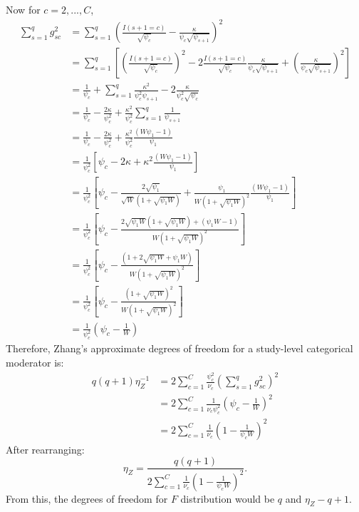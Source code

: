 Now for $c = 2,...,C$, 
\begin{equation}
    \begin{aligned}
\sum_{s=1}^q g_{sc}^2 &= \sum_{s=1}^q \left(\frac{I(s+1 = c)}{\sqrt{\psi_{c}}} - \frac{\kappa}{\psi_c \sqrt{\psi_{s+1}}}\right)^2 \\
&= \sum_{s=1}^q \left[ \left( \frac{I(s+1 = c)}{\sqrt{\psi_c}} \right)^2 - 2 \frac{I(s+1 = c)}{\sqrt{\psi_c}} \frac{\kappa}{\psi_c \sqrt{\psi_{s+1}}} + \left( \frac{\kappa}{\psi_c \sqrt{\psi_{s+1}}} \right)^2 \right] \\
&= \frac{1}{\psi_c} + \sum_{s=1}^q \frac{\kappa^2}{\psi_c^2 \psi_{s+1}} - 2 \frac{\kappa}{\psi_c^2 \sqrt{\psi_{c}}}\\
&= \frac{1}{\psi_c} - \frac{2 \kappa}{\psi_c^2} + \frac{\kappa^2}{\psi_c^2}\sum_{s=1}^q \frac{1}{\psi_{s+1}} \\
&= \frac{1}{\psi_c} - \frac{2 \kappa}{\psi_c^2} + \frac{\kappa^2}{\psi_c^2}\frac{(W \psi_1 - 1)}{\psi_1} \\
&= \frac{1}{\psi_c^2}\left[\psi_c - 2\kappa + \kappa^2\frac{(W \psi_1 - 1)}{\psi_1}\right] \\
&= \frac{1}{\psi_c^2}\left[\psi_c - \frac{2\sqrt{\psi_1}}{\sqrt{W}(1+\sqrt{\psi_1 W})} + \frac{\psi_1}{W(1+\sqrt{\psi_1 W})^2}\frac{(W \psi_1 - 1)}{\psi_1}\right] \\
&= \frac{1}{\psi_c^2}\left[\psi_c - \frac{2\sqrt{\psi_1 W}(1 + \sqrt{\psi_1 W}) +(\psi_1 W - 1)}{W(1+\sqrt{\psi_1 W})^2}  \right] \\
&= \frac{1}{\psi_c^2}\left[\psi_c - \frac{(1+2\sqrt{\psi_1 W}+\psi_1 W)}{W(1+\sqrt{\psi_1 W})^2}  \right] \\
&= \frac{1}{\psi_c^2}\left[\psi_c - \frac{(1+\sqrt{\psi_1 W})^2}{W(1+\sqrt{\psi_1 W})^2}  \right] \\
&= \frac{1}{\psi_c^2} \left(\psi_c - \frac{1}{W}\right)
\end{aligned}
\nonumber
\end{equation}
Therefore, Zhang's approximate degrees of freedom for a study-level categorical moderator is:
\begin{equation}
    \begin{aligned}
q(q + 1)\eta_Z^{-1} &= 2\sum_{c=1}^C \frac{\psi_c^2}{\nu_c} \left(\sum_{s=1}^q g_{sc}^2\right)^2 \\
&= 2\sum_{c=1}^C \frac{1}{\nu_c \psi_c^2}\left(\psi_c - \frac{1}{W}\right)^2 \\
&= 2\sum_{c=1}^C \frac{1}{\nu_c}\left(1 - \frac{1}{\psi_c W}\right)^2
\end{aligned}
\nonumber
\end{equation}
After rearranging: 
\begin{equation}
    \eta_Z = \frac{q(q + 1)}{2 \sum_{c=1}^C \frac{1}{\nu_c}\left(1 - \frac{1}{\psi_c W}\right)^2}.
    \nonumber
\end{equation}
From this, the degrees of freedom for $F$ distribution would be $q$ and $\eta_Z - q + 1$.

